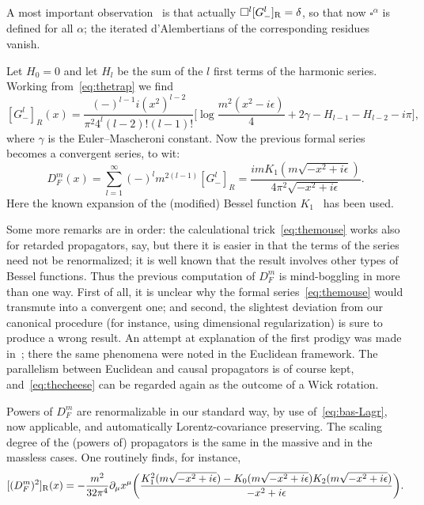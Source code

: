 \documentclass[a4paper,12pt]{article}
\makeatletter
\renewcommand{\a}{\alpha}          %
\newcommand{\del}{\partial}        %
\newcommand{\dl}{\delta}           %
\newcommand{\eps}{\epsilon}        %
\newcommand{\ga}{\gamma}           %
\newcommand{\7}{\dagger}           %
\def\section{\@startsection{section}{1}{\z@}{-3.5ex plus -1ex minus
      -.2ex}{2.3ex plus .2ex}{\large\bf}}
\theoremstyle{plain}
\theoremstyle{definition}
\makeatother
\begin{document}
A most important observation~\cite{ThreeFromBA} is that actually
$\square^l[G^l_-]_{\rm R}=\dl$, so that now $\square^\a$ is defined
for all $\a$; the iterated d'Alembertians of the corresponding
residues vanish.

Let $H_0 = 0$ and let $H_l$ be the sum of the $l$ first terms of the
harmonic series. Working from~\eqref{eq:thetrap} we find
$$
[G^l_-]_R(x) = \frac{(-)^{l-1}i(x^2)^{l-2}}{\pi^2 4^l(l-2)!(l-1)!}
\biggl[\log\frac{m^2(x^2-i\eps)}{4} + 2\ga -
H_{l-1} -  H_{l-2} - i\pi\biggr],
$$
where $\ga$ is the Euler--Mascheroni constant. Now the previous formal
series becomes a convergent series, to wit:
\begin{equation}
D^m_F(x) = \sum_{l=1}^\infty(-)^lm^{2(l-1)}[G^l_-]_R =
\frac{imK_1(m\sqrt{-x^2+i\eps})}{4\pi^2\sqrt{-x^2+i\eps}}.
\label{eq:thecheese}
\end{equation}
Here the known expansion of the (modified) Bessel function
$K_1$~\cite{AS} has been used.

Some more remarks are in order: the calculational
trick~\eqref{eq:themouse} works also for retarded propagators, say,
but there it is easier in that the terms of the series need not be
renormalized; it is well known that the result involves other types of
Bessel functions. Thus the previous computation of $D^m_F$ is
mind-boggling in more than one way. First of all, it is unclear
why the formal series~\eqref{eq:themouse} would transmute into a
convergent one; and second, the slightest deviation from our canonical
procedure (for instance, using dimensional regularization) is sure to
produce a wrong result. An attempt at explanation of the first prodigy
was made in~\cite{Natural}; there the same phenomena were noted in the
Euclidean framework. The parallelism between Euclidean and causal
propagators is of course kept, and~\eqref{eq:thecheese} can be
regarded again as the outcome of a Wick rotation.

\smallskip

Powers of $D^m_F$ are renormalizable in our standard way, by use
of~\eqref{eq:bas-Lagr}, now applicable, and automatically
Lorentz-covariance preserving. The scaling degree of the (powers of)
propagators is the same in the massive and in the massless cases. One
routinely finds, for instance,
$$
[(D^m_F)^2]_{\rm R}(x) =
-\frac{m^2}{32\pi^4} \del_\mu x^\mu \biggl(
\frac{K_1^2(m\sqrt{-x^2+i\eps})-K_0(m\sqrt{-x^2+i\eps})
K_2(m\sqrt{-x^2+i\eps})}{-x^2+i\eps} \biggr).
$$


\section{Outlook}
\end{document}
